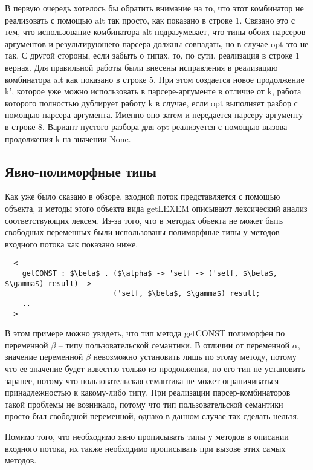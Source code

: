 \documentclass[conference]{IEEEtran}
\begin{document}
В первую очередь хотелось бы обратить внимание на то, что этот комбинатор не реализовать с помощью alt так просто, как показано в строке 1. Связано это с тем, что использование комбинатора alt подразумевает, что типы обоих парсеров-аргументов и результирующего парсера должны совпадать, но в случае opt это не так. С другой стороны, если забыть о типах, то, по сути, реализация в строке 1 верная. Для правильной работы были внесены исправления в реализацию комбинатора alt как показано в строке 5. При этом создается новое продолжение k', которое уже можно использовать в парсере-аргументе в отличие от k, работа которого полностью дублирует работу k в случае, если opt выполняет разбор с помощью парсера-аргумента. Именно оно затем и передается парсеру-аргументу в строке 8. Вариант пустого разбора для opt реализуется с помощью вызова продолжения k на значении None.

\subsection{Явно-полиморфные типы}

Как уже было сказано в обзоре, входной поток представляется с помощью объекта, и методы этого объекта вида getLEXEM описывают лексический анализ соответствующих лексем. Из-за того, что в методах объекта не может быть свободных переменных были использованы полиморфные типы у методов входного потока как показано ниже. 

\begin{lstlisting}
  < 
    getCONST : $\beta$ . ($\alpha$ -> 'self -> ('self, $\beta$, $\gamma$) result) ->
                         ('self, $\beta$, $\gamma$) result;
    ..
  >
\end{lstlisting}

В этом примере можно увидеть, что тип метода getCONST полиморфен по переменной $\beta$ -- типу пользовательской семантики. В отличии от переменной $\alpha$, значение переменной $\beta$ невозможно установить лишь по этому методу, потому что ее значение будет известно только из продолжения, но его тип не установить заранее, потому что пользовательская семантика не может ограничиваться принадлежностью к какому-либо типу. При реализации парсер-комбинаторов такой проблемы не возникало, потому что тип пользовательской семантики просто был свободной переменной, однако в данном случае так сделать нельзя.

Помимо того, что необходимо явно прописывать типы у методов в описании входного потока, их также необходимо прописывать при вызове этих самых методов.
\end{document}
